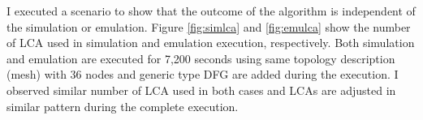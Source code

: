 I executed a scenario to show that the outcome of the algorithm is independent of the simulation or emulation. Figure \ref{fig:simlca} and \ref{fig:emulca} show the number of LCA used in simulation and emulation execution, respectively. Both simulation and emulation are executed for 7,200 seconds using same topology description (mesh) with 36 nodes and generic type DFG are added during the execution. I observed similar number of LCA used in both cases and LCAs are adjusted in similar pattern during the complete execution.
